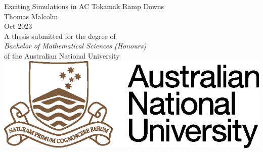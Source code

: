 \begin{titlepage}
\begin{center}

\vspace*{\fill} \Huge
                        Exciting Simulations in AC Tokamak Ramp Downs
\\
\vfill\vfill\Large
                          Thomas Malcolm
\\
\vfill\vfill
                          Oct 2023
\\
\vfill\vfill \normalsize
         A thesis submitted for the degree of \\
         \emph{Bachelor of Mathematical Sciences (Honours)} \\
         of the Australian National University
\vfill
         \includegraphics{ANU.eps}

\end{center}

\end{titlepage}
